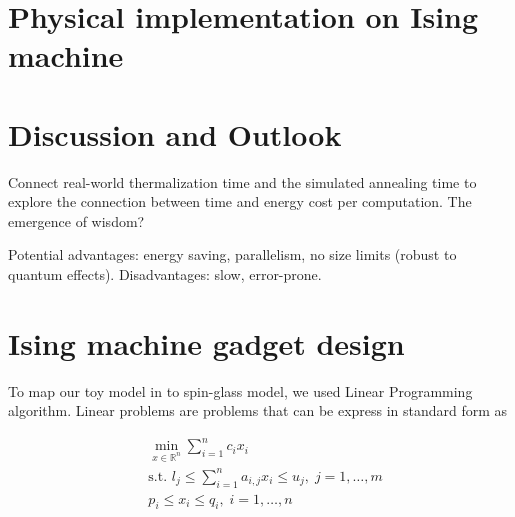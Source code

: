 \documentclass[twocolumn,superscriptaddress,english,showpacs,longbibliography]{revtex4-2}
\begin{document}
\section{Physical implementation on Ising machine}\label{spin-glass}




\section{Discussion and Outlook}
Connect real-world thermalization time and the simulated annealing time to explore the connection between time and energy cost per computation.
The emergence of wisdom?

Potential advantages: energy saving, parallelism, no size limits (robust to quantum effects). Disadvantages: slow, error-prone.

\begin{acknowledgments}
\end{acknowledgments}

%


\appendix

\section{Ising machine gadget design}\label{sec:gadget-design}
To map our toy model in  to
spin-glass model, we used Linear Programming algorithm.
Linear problems are problems that can be express in standard form as

\begin{equation}
    \begin{split}
        &\min_{x \in \mathbb{R}^n} \sum_{i=1}^n c_ix_i\\
        &\text{s.t. } l_j \leq \sum_{i=1}^n a_{i,j}x_i \leq u_j, \; j=1,\ldots,m\\
        &p_i \leq x_i \leq q_i, \; i=1,\ldots, n
    \end{split}
\end{equation}
\end{document}
